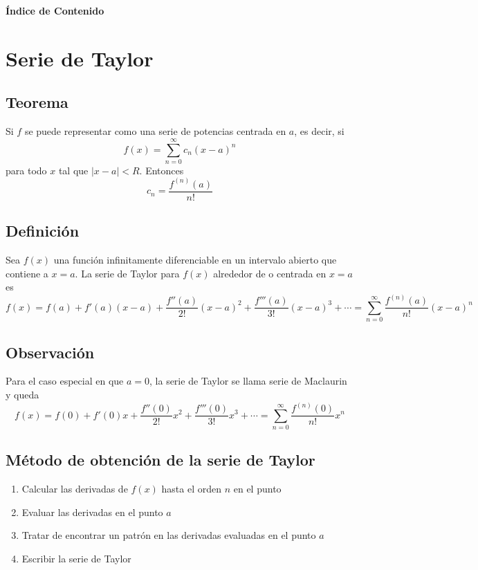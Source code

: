 \documentclass{article}
\begin{document}
\begin{center}
    \huge \textbf{Índice de Contenido}
\end{center}

\noindent\makebox[\linewidth]{\rule{\textwidth}{0.4pt}}

\startcontents
{}

\newpage

\section{Serie de Taylor}

\subsection{Teorema}
    Si $f$ se puede representar como una serie de potencias centrada en $a$, es decir, si 
    \begin{equation*}
        f(x) = \sum_{n=0}^{\infty} c_n(x-a)^n
    \end{equation*}
    para todo $x$ tal que $|x-a|<R$. Entonces
    \begin{equation*}
        c_n = \frac{f^{(n)}(a)}{n!}
    \end{equation*}

\subsection{Definición}
    Sea $f(x)$ una función infinitamente diferenciable en un intervalo abierto que contiene a $x=a$. La serie de Taylor para $f(x)$ alrededor de o centrada en $x=a$ es
    \begin{equation*}
        f(x) = f(a) + f'(a)(x-a) + \frac{f''(a)}{2!}(x-a)^2 + \frac{f'''(a)}{3!}(x-a)^3 + \cdots = \sum_{n=0}^{\infty} \frac{f^{(n)}(a)}{n!}(x-a)^n
    \end{equation*}


\subsection{Observación}
    Para el caso especial en que $a=0$, la serie de Taylor se llama serie de Maclaurin y queda
    \begin{equation*}
        f(x) = f(0) + f'(0)x + \frac{f''(0)}{2!}x^2 + \frac{f'''(0)}{3!}x^3 + \cdots = \sum_{n=0}^{\infty} \frac{f^{(n)}(0)}{n!}x^n
    \end{equation*}

\subsection{Método de obtención de la serie de Taylor}
\begin{enumerate}
    \item Calcular las derivadas de $f(x)$ hasta el orden $n$ en el punto
    \item Evaluar las derivadas en el punto $a$
    \item Tratar de encontrar un patrón en las derivadas evaluadas en el punto $a$
    \item Escribir la serie de Taylor
\end{enumerate}
\end{document}
